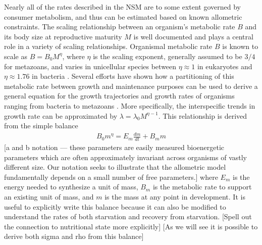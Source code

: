 \documentclass{pnastwo}
\begin{document}
\begin{article}
Nearly all of the rates described in the NSM are to some extent governed by consumer metabolism, and thus can be estimated based on known allometric constraints. 
The scaling relationship between an organism's metabolic rate $B$ and its body size at reproductive maturity $M$ is well documented \cite{West:2002it} and plays a central role in a variety of scaling relationships.
Organismal metabolic rate $B$ is known to scale as $B = B_0 M^\eta$, where $\eta$ is the scaling exponent, generally assumed to be $3/4$ for metazoans, and varies in unicellular species between $\eta\approx 1$ in eukaryotes and $\eta\approx 1.76$ in bacteria \cite{DeLong:2010dy}. Several efforts have shown how a partitioning of this metabolic rate between growth and maintenance purposes can be used to derive a general equation for the growth trajectories and growth rates of organisms ranging from bacteria to metazoans \cite{Kempes:2012hy}. More specifically, the interspecific trends in growth rate can be approximated by $\lambda = \lambda_0 M^{\eta-1}$. This relationship is derived from the simple balance
\begin{eqnarray}
\label{balance}
B_{0}m^{\eta}=E_{m}\frac{dm}{dt}+B_{m}m
\end{eqnarray}
 [a and b notation --- these parameters are easily measured bioenergetic parameters which are often approximately invariant across organisms of vastly different size. Our notation seeks to illustrate that the allometric model fundamentally depends on a small number of free parameters.]
 where $E_{m}$ is the energy needed to synthesize a unit of mass, $B_{m}$ is the metabolic rate to support an existing unit of mass, and $m$ is the mass at any point in development. It is useful to explicitly write this balance because it can also be modified to understand the rates of both starvation and recovery from starvation. [Spell out the connection to nutritional state more explicitly] [As we will see it is possible to derive both sigma and rho from this balance]
 

\end{article}
\end{document}
